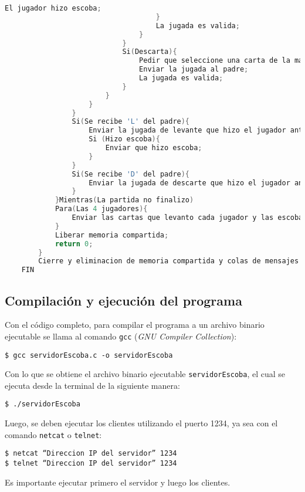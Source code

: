 \begin{lstlisting}[language=C]
                                        El jugador hizo escoba;
                                    }
                                    La jugada es valida;
                                }
                            }
                            Si(Descarta){
                                Pedir que seleccione una carta de la mano para descartar;
                                Enviar la jugada al padre;
                                La jugada es valida;
                            }
                        }
                    }
                }
                Si(Se recibe 'L' del padre){
                    Enviar la jugada de levante que hizo el jugador anterior;
                    Si (Hizo escoba){
                        Enviar que hizo escoba;
                    }
                }
                Si(Se recibe 'D' del padre){
                    Enviar la jugada de descarte que hizo el jugador anterior;
                }
            }Mientras(La partida no finalizo)
            Para(Las 4 jugadores){
                Enviar las cartas que levanto cada jugador y las escobas;
            }
            Liberar memoria compartida;
            return 0;
        }
        Cierre y eliminacion de memoria compartida y colas de mensajes
    FIN

\end{lstlisting}

\subsection{Compilación y ejecución del programa}

Con el código completo, para compilar el programa a un archivo binario ejecutable se llama al comando \texttt{gcc} (\textit{GNU Compiler Collection}):

\begin{center}
    \texttt{\$ gcc servidorEscoba.c -o servidorEscoba}\\
\end{center}

Con lo que se obtiene el archivo binario ejecutable \texttt{servidorEscoba}, el cual se ejecuta desde la terminal de la siguiente manera:

\begin{center}
    \texttt{\$ ./servidorEscoba}\\
\end{center}

Luego, se deben ejecutar los clientes utilizando el puerto 1234, ya sea con el comando \texttt{netcat} o \texttt{telnet}:

\begin{center}
    \texttt{\$ netcat \enquote{Direccion IP del servidor} 1234}\\
    \texttt{\$ telnet \enquote{Direccion IP del servidor} 1234}\\
\end{center}

Es importante ejecutar primero el servidor y luego los clientes.\\